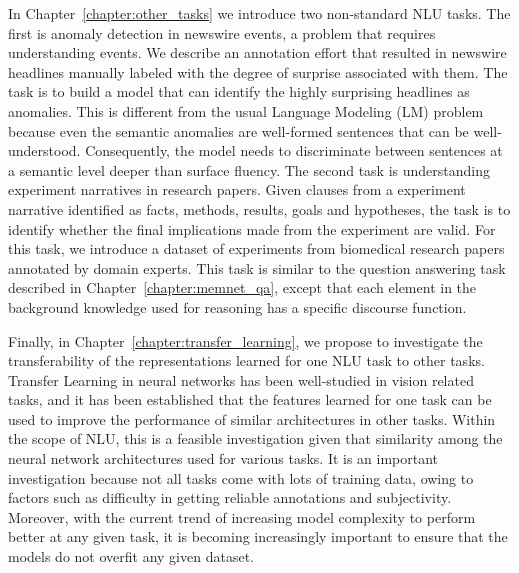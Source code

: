 In Chapter~\ref{chapter:other_tasks} we introduce two non-standard NLU tasks.
The first is anomaly detection in newswire events, a problem that requires understanding events.
We describe an annotation effort that resulted in newswire headlines manually labeled with the degree
of surprise associated with them. The task is to build a model that can identify the highly
surprising headlines as anomalies. This is different from the usual Language Modeling (LM) problem
because even the semantic anomalies are well-formed sentences that can be well-understood. Consequently,
the model needs to discriminate between sentences at a semantic level deeper than surface fluency. The second task is
understanding experiment narratives in research papers. Given clauses from a experiment narrative identified as facts, methods,
results, goals and hypotheses, the task is to identify whether the final implications made from the experiment are valid. For this task,
we introduce a dataset of experiments from biomedical research papers annotated by domain experts. This task is similar to the question answering 
task described in Chapter~\ref{chapter:memnet_qa}, except that each element in the background knowledge used for reasoning has a specific discourse function.

Finally, in Chapter~\ref{chapter:transfer_learning}, we propose to investigate the transferability of the representations learned for one NLU task to other tasks.
Transfer Learning in neural networks has been well-studied in vision related tasks, and it has been established that the features learned for one task can be
used to improve the performance of similar architectures in other tasks. Within the scope of NLU, this is a feasible investigation given that similarity
among the neural network architectures used for various tasks. It is an important investigation because not all tasks come with lots of training data, owing to factors
such as difficulty in getting reliable annotations and subjectivity. Moreover, with the current trend of increasing model complexity to perform better at any given task,
it is becoming increasingly important to ensure that the models do not overfit any given dataset.